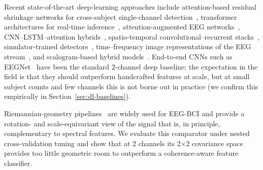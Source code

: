 \documentclass[journal]{IEEEtran}
\DeclareRobustCommand{\add}[1]{#1}                         %
\DeclareRobustCommand{\add}[1]{\hl{#1}}
\begin{document}
Recent state-of-the-art deep-learning approaches include attention-based residual shrinkage networks for cross-subject single-channel detection~\cite{id3rsnet2024}, transformer architectures for real-time inference~\cite{transformer2025drowsiness}, attention-augmented EEG networks~\cite{attention2024eeg}, CNN--LSTM--attention hybrids~\cite{cnnlstmsafedrive2025,hybridcnn2025}, \add{spatio-temporal convolutional--recurrent stacks~\mbox{\cite{jeong2022consumer}}, simulator-trained detectors~\mbox{\cite{hybrid2024simulated}}, time--frequency image representations of the EEG stream~\mbox{\cite{cheng2021bibm}},} and scalogram-based hybrid models~\cite{scalograms2025drowsiness}. End-to-end CNNs such as EEGNet~\cite{lawhern2018eegnet} have been the standard 2-channel deep baseline; the expectation in the field is that they should outperform handcrafted features at scale, but at small subject counts and few channels this is not borne out in practice (we confirm this empirically in Section~\ref{sec:dl-baselines}).

Riemannian-geometry pipelines~\cite{barachant2013riemannian} are widely used for EEG-BCI and provide a rotation- and scale-equivariant view of the signal that is, in principle, complementary to spectral features. We evaluate this comparator under nested cross-validation tuning and show that at 2 channels its 2$\times$2 covariance space provides too little geometric room to outperform a coherence-aware feature classifier.
\end{document}
